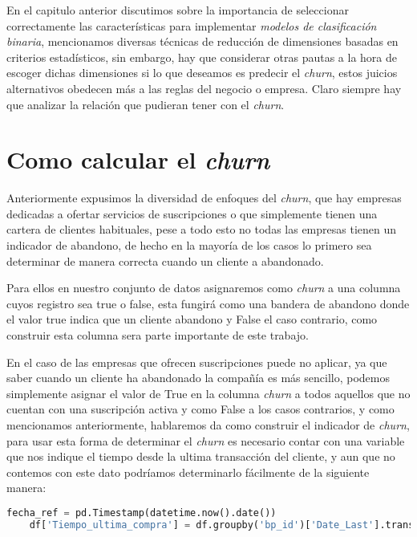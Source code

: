 En el capitulo anterior discutimos sobre la importancia de seleccionar correctamente las características para implementar \textsl{modelos de clasificación binaria}, mencionamos diversas técnicas de reducción de dimensiones basadas en criterios estadísticos, sin embargo, hay que considerar otras pautas a la hora de escoger dichas dimensiones si lo que deseamos es predecir el \textit{churn}, estos juicios alternativos obedecen más a las reglas del negocio o empresa. Claro siempre hay que analizar la relación que pudieran tener con el \textit{churn}. 



\section{Como calcular el \textit{churn}}

Anteriormente expusimos la diversidad de enfoques del \textit{churn}, que hay empresas dedicadas a ofertar servicios de suscripciones o que simplemente tienen una cartera de clientes habituales, pese a todo esto no todas las empresas tienen un indicador de abandono, de hecho en la mayoría de los casos lo primero sea determinar de manera correcta cuando un cliente a abandonado.

Para ellos en nuestro conjunto de datos asignaremos como \textit{churn} a una columna cuyos registro sea true o false, esta fungirá como una bandera de abandono donde el valor true indica que un cliente abandono y False el caso contrario, como construir esta columna sera parte importante de este trabajo.

En el caso de las empresas que ofrecen suscripciones puede no aplicar, ya que saber cuando un cliente ha abandonado la compañía es más sencillo, podemos simplemente asignar el valor de True en la columna \textit{churn} a todos aquellos que no cuentan con una suscripción activa y como False a los casos contrarios, y como mencionamos anteriormente, hablaremos da como construir el indicador de \textit{churn}, para usar esta forma de determinar el \textit{churn} es necesario contar con una variable que nos indique el tiempo desde la ultima transacción del cliente, y aun que no contemos con este dato podríamos determinarlo fácilmente de la siguiente manera:

\begin{lstlisting}[language=Python, caption=Ejemplo del calculo de fecha desde la ultima compra, label=EjemplodeTDUC]
	fecha_ref = pd.Timestamp(datetime.now().date())
	df['Tiempo_ultima_compra'] = df.groupby('bp_id')['Date_Last'].transform(lambda x: np.abs((fecha_ref - x.max()).days))
	
\end{lstlisting}


